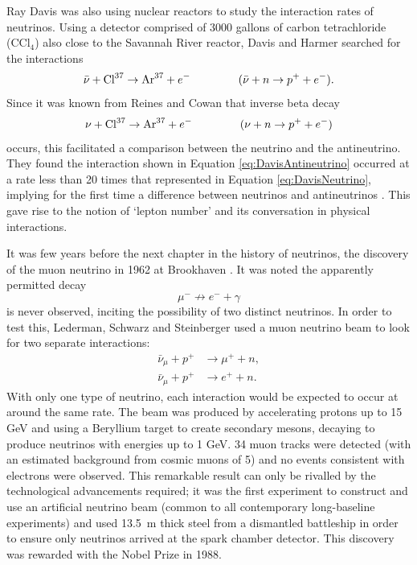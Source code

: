 Ray Davis was also using nuclear reactors to study the interaction rates of neutrinos.  Using a detector comprised of 3000 gallons of carbon tetrachloride (CCl$_4$) also close to the Savannah River reactor, Davis and Harmer searched for the interactions
\begin{equation}\label{eq:DavisAntineutrino}
  \bar{\nu} + \textnormal{Cl}^{37} \rightarrow \textnormal{Ar}^{37} + e^- \hspace{1.5cm} (\bar{\nu} + n \rightarrow p^+ + e^-).
\end{equation}
Since it was known from Reines and Cowan that inverse beta decay
\begin{equation}\label{eq:DavisNeutrino}
  \nu + \textnormal{Cl}^{37} \rightarrow \textnormal{Ar}^{37} + e^- \hspace{1.5cm} (\nu + n \rightarrow p^+ + e^-)
\end{equation}
occurs, this facilitated a comparison between the neutrino and the antineutrino.  They found the interaction shown in Equation \ref{eq:DavisAntineutrino} occurred at a rate less than 20 times that represented in Equation \ref{eq:DavisNeutrino}, implying for the first time a difference between neutrinos and antineutrinos \cite{Davis1959}.  This gave rise to the notion of `lepton number' and its conversation in physical interactions.

It was few years before the next chapter in the history of neutrinos, the discovery of the muon neutrino in 1962 at Brookhaven \cite{Danby1962}.  It was noted the apparently permitted decay
\begin{equation}
\mu^- \not\rightarrow e^- + \gamma
\end{equation}
is never observed, inciting the possibility of two distinct neutrinos.  In order to test this, Lederman, Schwarz and Steinberger used a muon neutrino beam to look for two separate interactions:
\begin{align}
  \bar{\nu}_{\mu} + p^+ &\rightarrow \mu^+ + n, \\
  \bar{\nu}_{\mu} + p^+ &\rightarrow e^+ + n.
\end{align}
With only one type of neutrino, each interaction would be expected to occur at around the same rate.  The beam was produced by accelerating protons up to 15 GeV and using a Beryllium target to create secondary mesons, decaying to produce neutrinos with energies up to 1 GeV.  34 muon tracks were detected (with an estimated background from cosmic muons of 5) and no events consistent with electrons were observed.  This remarkable result can only be rivalled by the technological advancements required; it was the first experiment to construct and use an artificial neutrino beam (common to all contemporary long-baseline experiments) and used 13.5~m thick steel from a dismantled battleship in order to ensure only neutrinos arrived at the spark chamber detector.  This discovery was rewarded with the Nobel Prize in 1988.

